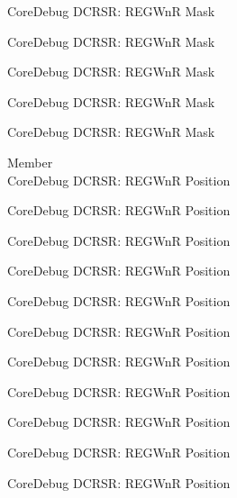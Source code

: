 \begin{DoxyRefList}
\label{deprecated__deprecated000928}%
%
Core\+Debug DCRSR\+: REGWnR Mask 

\label{deprecated__deprecated000987}%
%
Core\+Debug DCRSR\+: REGWnR Mask 

\label{deprecated__deprecated001063}%
%
Core\+Debug DCRSR\+: REGWnR Mask 

\label{deprecated__deprecated001152}%
%
Core\+Debug DCRSR\+: REGWnR Mask 

\label{deprecated__deprecated001254}%
%
Core\+Debug DCRSR\+: REGWnR Mask  
\item[Member \doxylink{group___c_m_s_i_s___core_debug_ga51e75942fc0614bc9bb2c0e96fcdda9a}{Core\+Debug\+\_\+\+DCRSR\+\_\+\+REGWn\+R\+\_\+\+Pos} ]\hfill \\
\label{deprecated__deprecated000041}%
%
Core\+Debug DCRSR\+: REGWnR Position 

\label{deprecated__deprecated000129}%
%
Core\+Debug DCRSR\+: REGWnR Position 

\label{deprecated__deprecated000185}%
%
Core\+Debug DCRSR\+: REGWnR Position 

\label{deprecated__deprecated000268}%
%
Core\+Debug DCRSR\+: REGWnR Position 

\label{deprecated__deprecated000327}%
%
Core\+Debug DCRSR\+: REGWnR Position 

\label{deprecated__deprecated000403}%
%
Core\+Debug DCRSR\+: REGWnR Position 

\label{deprecated__deprecated000492}%
%
Core\+Debug DCRSR\+: REGWnR Position 

\label{deprecated__deprecated000594}%
%
Core\+Debug DCRSR\+: REGWnR Position 

\label{deprecated__deprecated000700}%
%
Core\+Debug DCRSR\+: REGWnR Position 

\label{deprecated__deprecated000788}%
%
Core\+Debug DCRSR\+: REGWnR Position 

\label{deprecated__deprecated000844}%
%
Core\+Debug DCRSR\+: REGWnR Position 


\end{DoxyRefList}
